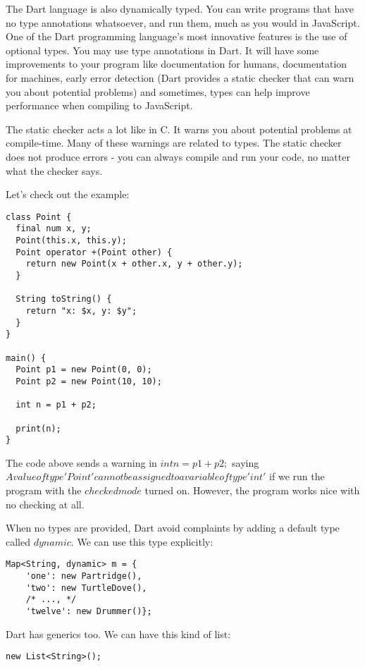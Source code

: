 The Dart language is also dynamically typed. You can write programs that have no
type annotations whatsoever, and run them, much as you would in JavaScript. One
of the Dart programming language’s most innovative features is the use of
optional types. You may use type annotations in Dart. It will have some
improvements to your program like documentation for humans, documentation for
machines, early error detection (Dart provides a static checker that can warn
you about  potential problems) and sometimes, types can help improve performance
when  compiling to JavaScript.

The static checker acts a lot like in C. It warns you about potential  problems
at compile-time. Many of these warnings are related to types. The static checker
does not produce errors - you can always compile and run your code, no matter
what the checker says.

Let's check out the example:

\begin{lstlisting}[label=dpoint,caption=Dart Warning Example]
class Point {
  final num x, y;
  Point(this.x, this.y);
  Point operator +(Point other) {
    return new Point(x + other.x, y + other.y);
  }

  String toString() {
    return "x: $x, y: $y";
  }
}

main() {
  Point p1 = new Point(0, 0);
  Point p2 = new Point(10, 10);

  int n = p1 + p2;

  print(n);
}
\end{lstlisting}

The code above sends a warning in $int n = p1 + p2;$ saying  $A value of
type 'Point' cannot be assigned to a variable of type 'int'$ if we run the
program with the $checked mode$ turned on. However, the program works nice with
no checking at all.

When no types are provided, Dart avoid complaints by adding a default type
called $dynamic$. We can use this type explicitly:

\begin{lstlisting}[label=dartMap,caption=Dart dynamic type]
Map<String, dynamic> m = {
    'one': new Partridge(),
    'two': new TurtleDove(),
    /* ..., */
    'twelve': new Drummer()};
\end{lstlisting}

Dart has generics too. We can have this kind of list:

\begin{verbatim}
new List<String>();
\end{verbatim}


